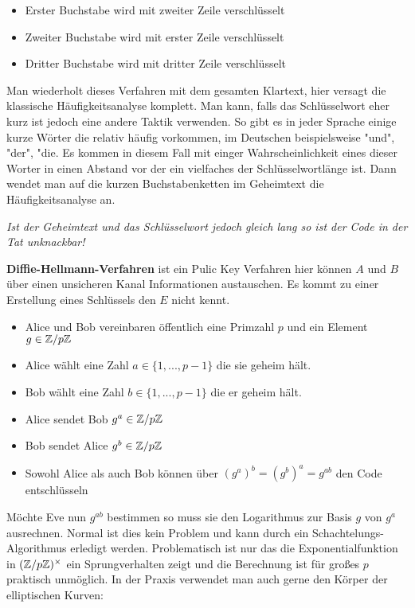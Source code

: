 \documentclass{report}
\begin{document}
\begin{itemize}
  \item Erster Buchstabe wird mit zweiter Zeile verschlüsselt
      \item Zweiter Buchstabe wird mit erster Zeile verschlüsselt
          \item Dritter Buchstabe wird mit dritter Zeile verschlüsselt
\end{itemize}

Man wiederholt dieses Verfahren mit dem gesamten Klartext, hier versagt die klassische Häufigkeitsanalyse komplett. Man kann, falls das Schlüsselwort eher kurz ist jedoch eine andere Taktik verwenden. So gibt es in jeder Sprache einige kurze Wörter die relativ häufig vorkommen, im Deutschen beispielsweise "und", "der", "die. Es kommen in diesem Fall mit einger Wahrscheinlichkeit eines dieser Worter in einen Abstand vor der ein vielfaches der Schlüsselwortlänge ist. Dann wendet man auf die kurzen Buchstabenketten im Geheimtext die Häufigkeitsanalyse an.

\emph{Ist der Geheimtext und das Schlüsselwort jedoch gleich lang so ist der Code in der Tat unknackbar!}

\textbf{Diffie-Hellmann-Verfahren} ist ein Pulic Key Verfahren hier können $A$ und $B$ über einen unsicheren Kanal Informationen austauschen. Es kommt zu einer Erstellung eines Schlüssels den $E$ nicht kennt.

\begin{itemize}
  \item Alice und Bob vereinbaren öffentlich eine Primzahl $p$ und ein Element $g \in \ZZ / p \ZZ$
  \item Alice wählt eine Zahl $a \in \{1,...,p-1 \}$ die sie geheim hält.
  \item Bob wählt eine Zahl $b \in \{1,...,p-1\}$ die er geheim hält.
      \item Alice sendet Bob $g^a \in \ZZ / p \ZZ$
          \item Bob sendet Alice  $g^b \in \ZZ / p \ZZ$
          \item Sowohl Alice als auch Bob können über $(g^a)^b = (g^b)^a = g^{ab}$ den Code entschlüsseln
\end{itemize}


Möchte Eve nun $g^{ab}$ bestimmen so muss sie den Logarithmus zur Basis $g$ von $g^a$ ausrechnen. Normal ist dies kein Problem und kann durch ein Schachtelungs-Algorithmus erledigt werden. Problematisch ist nur das die Exponentialfunktion in $(\ZZ / p\ZZ)^\times$ ein Sprungverhalten zeigt und die Berechnung ist für großes $p$ praktisch unmöglich. In der Praxis verwendet man auch gerne den Körper der elliptischen Kurven:
\end{document}
